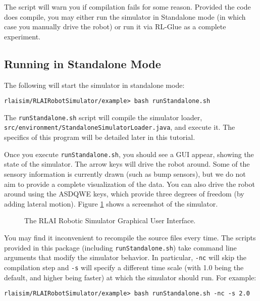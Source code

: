 \documentclass[12pt]{article}
\newcommand{\code}[1]{\texttt{#1}}
\begin{document}
The script will warn you if compilation fails for some reason. Provided the
code does compile, you may either run the simulator in Standalone mode
(in which case you manually drive the robot) or run it via RL-Glue as a 
complete experiment.

\subsection{Running in Standalone Mode}\label{subsec:standalone}

The following will start the simulator in standalone mode:

\begin{verbatim}
rlaisim/RLAIRobotSimulator/example> bash runStandalone.sh 
\end{verbatim}

The \verb+runStandalone.sh+ script will compile the simulator loader,\\
\verb+src/environment/StandaloneSimulatorLoader.java+, and execute it. The 
specifics of this program will be detailed later in this tutorial.

Once you execute \verb+runStandalone.sh+, you should see a GUI appear, showing
the state of the simulator. The arrow keys will drive the robot around. Some 
of the
sensory information is currently drawn (such as bump sensors), but we do not
aim to provide a complete visualization of the data. You can also drive the
robot around using the ASDQWE keys, which provide three degrees of freedom
(by adding lateral motion). Figure \ref{fig:gui} shows a screenshot of
the simulator.

\begin{figure}\label{fig:gui}
\centerline{
}
\caption{The RLAI Robotic Simulator Graphical User Interface.}
\end{figure}

You may find it inconvenient to recompile the source files every time. The
scripts provided in this package (including \code{runStandalone.sh}) take
command line arguments that modify the simulator behavior. In particular,
\code{-nc} will skip the compilation step and \code{-s} will specify a 
different time scale (with 1.0 being the default, and higher being faster)
at which the simulator should run. For example:

\begin{verbatim}
rlaisim/RLAIRobotSimulator/example> bash runStandalone.sh -nc -s 2.0
\end{verbatim}
\end{document}
